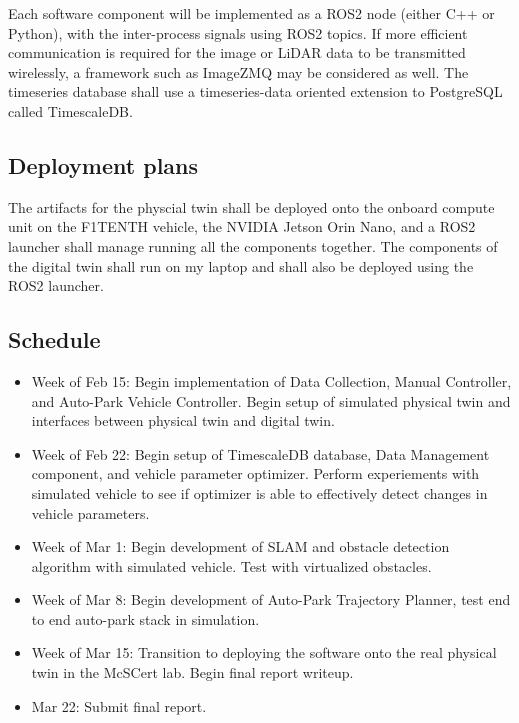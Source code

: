 Each software component will be implemented as a ROS2 node (either C++ or Python), with the inter-process signals using ROS2 topics. If more efficient communication is required for the image or LiDAR data to be transmitted wirelessly, a framework such as ImageZMQ may be considered as well. The timeseries database shall use a timeseries-data oriented extension to PostgreSQL called TimescaleDB.

\subsection{Deployment plans}

The artifacts for the physcial twin shall be deployed onto the onboard compute unit on the F1TENTH vehicle, the NVIDIA Jetson Orin Nano, and a ROS2 launcher shall manage running all the components together. The components of the digital twin shall run on my laptop and shall also be deployed using the ROS2 launcher.

\subsection{Schedule}

\begin{itemize}
    \item Week of Feb 15: Begin implementation of Data Collection, Manual Controller, and Auto-Park Vehicle Controller. Begin setup of simulated physical twin and interfaces between physical twin and digital twin.
    \item Week of Feb 22: Begin setup of TimescaleDB database, Data Management component, and vehicle parameter optimizer. Perform experiements with simulated vehicle to see if optimizer is able to effectively detect changes in vehicle parameters.
    \item Week of Mar 1: Begin development of SLAM and obstacle detection algorithm with simulated vehicle. Test with virtualized obstacles.
    \item Week of Mar 8: Begin development of Auto-Park Trajectory Planner, test end to end auto-park stack in simulation.
    \item Week of Mar 15: Transition to deploying the software onto the real physical twin in the McSCert lab. Begin final report writeup.
    \item Mar 22: Submit final report.
\end{itemize}

